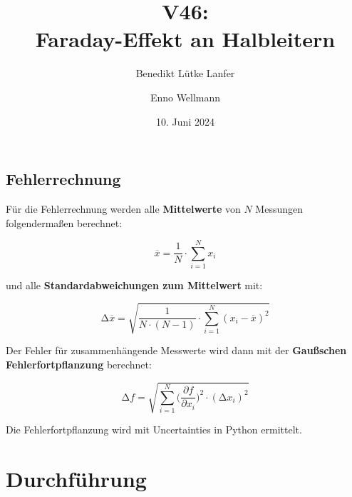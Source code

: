 

\title{V46:\\ Faraday-Effekt an Halbleitern}
\author{Benedikt Lütke Lanfer \and Enno Wellmann}
\date{10. Juni 2024}
\publishers{TU Dortmund – Fakultät Physik}



\tableofcontents
\newpage





\subsection{Fehlerrechnung}
Für die Fehlerrechnung werden alle \textbf{Mittelwerte} von $N$ Messungen folgendermaßen berechnet:

\begin{equation}
    \overline{x} = \frac{1}{N} \cdot \sum_{i=1}^N x_i
    \label{eqn:Mittelwert}
\end{equation}

und alle \textbf{Standardabweichungen zum Mittelwert} mit:

\begin{equation}
    \increment\overline{x} = \sqrt{\frac{1}{N\cdot(N-1)}\cdot\sum_{i=1}^N (x_i-\overline{x})^2}
    \label{eqn:St_Mittelwert}
\end{equation}

Der Fehler für zusammenhängende Messwerte wird dann mit der \textbf{Gaußschen Fehlerfortpflanzung} berechnet:

\begin{equation}
    \increment{f} = \sqrt{ \sum_{i = 1}^{N}  \biggl(\frac{\partial{f}}{\partial{x_i}}\biggr)^2\cdot(\increment{x_i})^2}
    \label{eqn:Gauss}
\end{equation}

Die Fehlerfortpflanzung wird mit Uncertainties in Python \cite{uncertainties} ermittelt.


\section{Durchführung}


